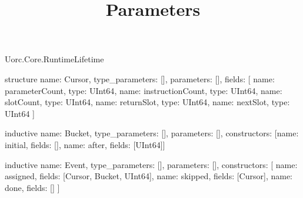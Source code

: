 \begin{lexlean}{Uorc.Core.RuntimeLifetime}
\title{Parameters}
\begin{semanticmodule}
structure{
  name: Cursor,
  type_parameters: [],
  parameters: [],
  fields: [
    {name: parameterCount, type: UInt64},
    {name: instructionCount, type: UInt64},
    {name: slotCount, type: UInt64},
    {name: returnSlot, type: UInt64},
    {name: nextSlot, type: UInt64}
  ]
}

inductive{
  name: Bucket,
  type_parameters: [],
  parameters: [],
  constructors: [{name: initial, fields: []}, {name: after, fields: [UInt64]}]
}

inductive{
  name: Event,
  type_parameters: [],
  parameters: [],
  constructors: [
    {name: assigned, fields: [Cursor, Bucket, UInt64]},
    {name: skipped, fields: [Cursor]},
    {name: done, fields: []}
  ]
}


\end{semanticmodule}
\end{lexlean}
